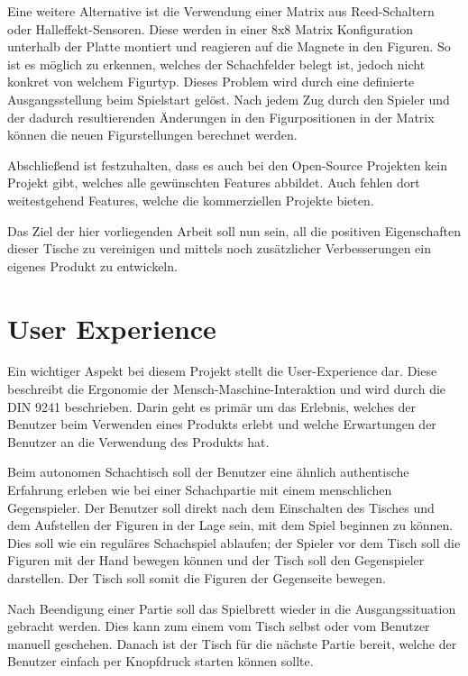 Eine weitere Alternative ist die Verwendung einer Matrix aus
Reed-Schaltern oder Halleffekt-Sensoren. Diese werden in einer 8x8
Matrix Konfiguration unterhalb der Platte montiert und reagieren auf die
Magnete in den Figuren. So ist es möglich zu erkennen, welches der
Schachfelder belegt ist, jedoch nicht konkret von welchem Figurtyp.
Dieses Problem wird durch eine definierte Ausgangsstellung beim
Spielstart gelöst. Nach jedem Zug durch den Spieler und der dadurch
resultierenden Änderungen in den Figurpositionen in der Matrix können
die neuen Figurstellungen berechnet werden.

Abschließend ist festzuhalten, dass es auch bei den Open-Source
Projekten kein Projekt gibt, welches alle gewünschten Features abbildet.
Auch fehlen dort weitestgehend Features, welche die kommerziellen
Projekte bieten.

Das Ziel der hier vorliegenden Arbeit soll nun sein, all die positiven
Eigenschaften dieser Tische zu vereinigen und mittels noch zusätzlicher
Verbesserungen ein eigenes Produkt zu entwickeln.

\hypertarget{user-experience}{%
\section{User Experience}\label{user-experience}}

Ein wichtiger Aspekt bei diesem Projekt stellt die User-Experience dar.
Diese beschreibt die Ergonomie der Mensch-Maschine-Interaktion und wird
durch die DIN 9241\cite{din9241} beschrieben. Darin geht es primär
um das Erlebnis, welches der Benutzer beim Verwenden eines Produkts
erlebt und welche Erwartungen der Benutzer an die Verwendung des
Produkts hat.

Beim autonomen Schachtisch soll der Benutzer eine ähnlich authentische
Erfahrung erleben wie bei einer Schachpartie mit einem menschlichen
Gegenspieler. Der Benutzer soll direkt nach dem Einschalten des Tisches
und dem Aufstellen der Figuren in der Lage sein, mit dem Spiel beginnen
zu können. Dies soll wie ein reguläres Schachspiel ablaufen; der Spieler
vor dem Tisch soll die Figuren mit der Hand bewegen können und der Tisch
soll den Gegenspieler darstellen. Der Tisch soll somit die Figuren der
Gegenseite bewegen.

Nach Beendigung einer Partie soll das Spielbrett wieder in die
Ausgangssituation gebracht werden. Dies kann zum einem vom Tisch selbst
oder vom Benutzer manuell geschehen. Danach ist der Tisch für die
nächste Partie bereit, welche der Benutzer einfach per Knopfdruck
starten können sollte.

